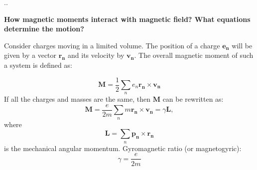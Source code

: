 \documentclass{beamer}
\begin{document}
\begin{frame}[shrink=5]{\thesection.\thesubsection. \insertsubsection}
    
    \textbf{How magnetic moments interact with magnetic field? What equations determine the motion?}
	
	 Consider charges moving in a limited volume. The position of a charge $\bm{e_n}$ will be given by a vector $\bm{r_n}$ and its velocity by $\bm{v_n}$. The overall magnetic moment of such a system is defined as:
			
			\begin{equation}
			\bm{M} = \frac{1}{2} \sum_{n} e_n\bm{r_n} \times \bm{v_n}
			\end{equation}
	\onslide<3->
		If all the charges and masses are the same, then $\bm{M}$ can be rewritten as:	
			\begin{equation} \label{eq:1}
			\bm{M} = \frac{e}{2m} \sum_{n} m\bm{r_n} \times \bm{v_n} = \gamma \bm{L},
			\end{equation}
			where
			\begin{equation}
			\bm{L} = \sum_{n} \bm{p_n} \times \bm{r_n}
			\end{equation}
			is the mechanical angular momentum.
			\alert{Gyromagnetic ratio} (or magnetogyric): 
			\begin{equation}
			\gamma = \dfrac{e}{2m}
			\end{equation}
			


\end{frame}
\end{document}
